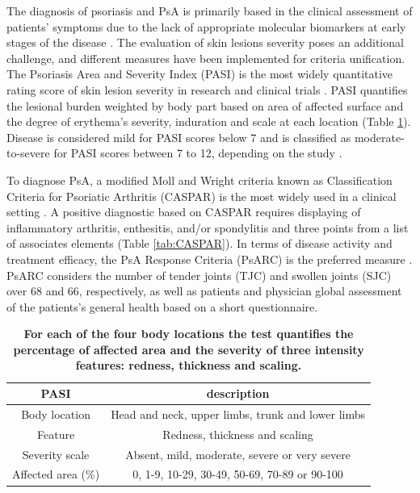The diagnosis of psoriasis and PsA is primarily based in the clinical assessment of patients’ symptoms due to the lack of appropriate molecular biomarkers at early stages of the disease \parencite{Villanova2013}. The evaluation of skin lesions severity poses an additional challenge, and different measures have been implemented for criteria unification. The Psoriasis Area and Severity Index (PASI) is the most widely quantitative rating score of skin lesion severity in research and clinical trials \parencite{Fredriksson1978,Finlay2005}. PASI quantifies the lesional burden weighted by body part based on area of affected surface and the degree of erythema’s severity, induration and scale at each location (Table \ref{tab:PASI}). Disease is considered mild for PASI scores below 7 and is classified as moderate-to-severe for PASI scores between 7 to 12, depending on the study \parencite{Finlay2005, Schmitt2005,Langewouters2008}.

To diagnose PsA, a modified Moll and Wright criteria known as Classification Criteria for Psoriatic Arthritis (CASPAR) is the most widely used in a clinical setting \parencite {Taylor2006}. A positive diagnostic based on CASPAR requires displaying of inflammatory arthritis, enthesitis, and/or spondylitis and three points from a list of associates elements (Table \ref{tab:CASPAR}). In terms of disease activity and treatment efficacy, the PsA Response Criteria (PsARC) is the preferred measure \parencite{Philipp2011,Clegg1996}. PsARC considers the number of tender joints (TJC) and swollen joints (SJC) over 68 and 66, respectively, as well as patients and physician global assessment of the patients’s general health based on a short questionnaire. 

\begin{table}[htbp]
\setlength{\tabcolsep}{20pt}
\renewcommand{\arraystretch}{1.5}
\begin{tabular}{@{} c c}
\textbf{PASI} & \textbf{description} \\
\midrule
\midrule
Body location  & Head and neck, upper limbs, trunk and lower limbs\\
Feature        & Redness, thickness and scaling \\
Severity scale & Absent, mild, moderate, severe or very severe \\
Affected area (\%)  & 0, 1-9, 10-29, 30-49, 50-69, 70-89 or 90-100 \\
\bottomrule
\end{tabular}
\medskip %
\caption[Variables and scoring used in the Psoriasis Area and Severity Index (PASI)]{\textbf{For each of the four body locations the test quantifies the percentage of affected area and the severity of three intensity features: redness, thickness and scaling.}}
\label{tab:PASI}
\end{table}
\bigskip %




